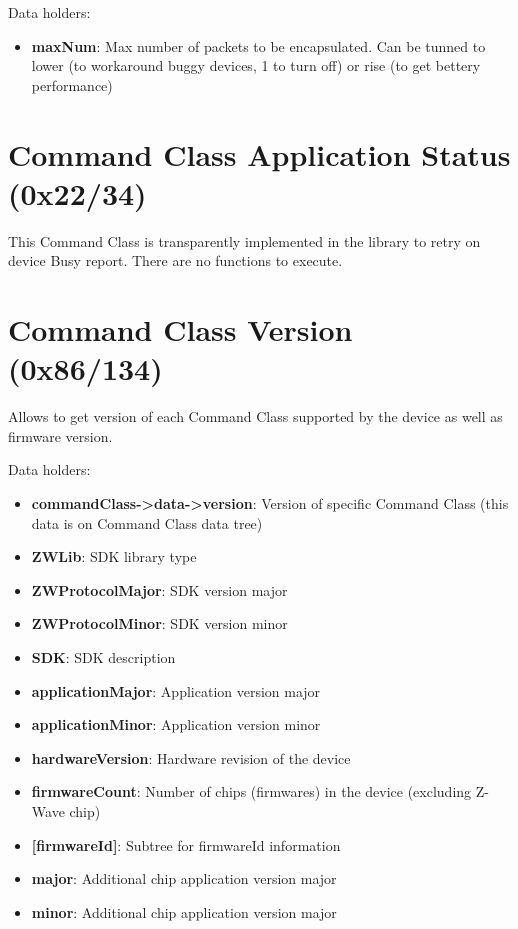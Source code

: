 \noindent
Data holders:

\begin{itemize}
\item \textbf{maxNum}: Max number of packets to be encapsulated. Can be tunned to lower (to workaround buggy devices, 1 to turn off) or rise (to get bettery performance)
\end{itemize}


\section{Command Class Application Status (0x22/34)}

This Command Class is transparently implemented in the library to retry on device Busy report. There are no functions to execute.

\section{Command Class Version (0x86/134)}

Allows to get version of each Command Class supported by the device as well as firmware version.
\newline

\noindent
Data holders:

\begin{itemize}
\item \textbf{commandClass->data->version}: Version of specific Command Class (this data is on Command Class data tree)
\item \textbf{ZWLib}: SDK library type
\item \textbf{ZWProtocolMajor}: SDK version major
\item \textbf{ZWProtocolMinor}: SDK version minor
\item \textbf{SDK}: SDK description
\item \textbf{applicationMajor}: Application version major
\item \textbf{applicationMinor}: Application version minor
\item \textbf{hardwareVersion}: Hardware revision of the device
\item \textbf{firmwareCount}: Number of chips (firmwares) in the device (excluding Z-Wave chip)
\item \textbf{[firmwareId]}: Subtree for firmwareId information
\item \qquad\textbf{major}: Additional chip application version major
\item \qquad\textbf{minor}: Additional chip application version major
\end{itemize}


